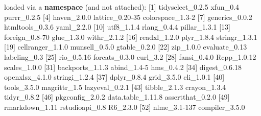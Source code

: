 \documentclass[]{article}
\newenvironment{Shaded}{\begin{snugshade}}{\end{snugshade}}
\newcommand{\KeywordTok}[1]{\textcolor[rgb]{0.13,0.29,0.53}{\textbf{{#1}}}}
\newcommand{\DecValTok}[1]{\textcolor[rgb]{0.00,0.00,0.81}{{#1}}}
\newcommand{\FloatTok}[1]{\textcolor[rgb]{0.00,0.00,0.81}{{#1}}}
\newcommand{\StringTok}[1]{\textcolor[rgb]{0.31,0.60,0.02}{{#1}}}
\newcommand{\NormalTok}[1]{{#1}}
\begin{document}
\begin{Shaded}
\begin{Highlighting}[]
\NormalTok{loaded via a }\KeywordTok{namespace} \NormalTok{(and not attached):}
\StringTok{ }\NormalTok{[}\DecValTok{1}\NormalTok{] tidyselect_0}\FloatTok{.2.5}  \NormalTok{xfun_0}\FloatTok{.4}          \NormalTok{purrr_0}\FloatTok{.2.5}      
 \NormalTok{[}\DecValTok{4}\NormalTok{] haven_2}\FloatTok{.0.0}       \NormalTok{lattice_0}\FloatTok{.20}\DecValTok{-35}   \NormalTok{colorspace_1}\FloatTok{.3}\DecValTok{-2} 
 \NormalTok{[}\DecValTok{7}\NormalTok{] generics_0}\FloatTok{.0.2}    \NormalTok{htmltools_0}\FloatTok{.3.6}   \NormalTok{yaml_2}\FloatTok{.2.0}       
\NormalTok{[}\DecValTok{10}\NormalTok{] utf8_1}\FloatTok{.1.4}        \NormalTok{rlang_0}\FloatTok{.4.4}       \NormalTok{pillar_1}\FloatTok{.3.1}     
\NormalTok{[}\DecValTok{13}\NormalTok{] foreign_0}\FloatTok{.8}\DecValTok{-70}    \NormalTok{glue_1}\FloatTok{.3.0}        \NormalTok{withr_2}\FloatTok{.1.2}      
\NormalTok{[}\DecValTok{16}\NormalTok{] readxl_1}\FloatTok{.2.0}      \NormalTok{plyr_1}\FloatTok{.8.4}        \NormalTok{stringr_1}\FloatTok{.3.1}    
\NormalTok{[}\DecValTok{19}\NormalTok{] cellranger_1}\FloatTok{.1.0}  \NormalTok{munsell_0}\FloatTok{.5.0}     \NormalTok{gtable_0}\FloatTok{.2.0}     
\NormalTok{[}\DecValTok{22}\NormalTok{] zip_1}\FloatTok{.0.0}         \NormalTok{evaluate_0}\FloatTok{.13}     \NormalTok{labeling_0}\FloatTok{.3}     
\NormalTok{[}\DecValTok{25}\NormalTok{] rio_0}\FloatTok{.5.16}        \NormalTok{forcats_0}\FloatTok{.3.0}     \NormalTok{curl_3}\FloatTok{.2}         
\NormalTok{[}\DecValTok{28}\NormalTok{] fansi_0}\FloatTok{.4.0}       \NormalTok{Rcpp_1}\FloatTok{.0.12}       \NormalTok{scales_1}\FloatTok{.0.0}     
\NormalTok{[}\DecValTok{31}\NormalTok{] backports_1}\FloatTok{.1.3}   \NormalTok{abind_1}\FloatTok{.4}\DecValTok{-5}       \NormalTok{hms_0}\FloatTok{.4.2}        
\NormalTok{[}\DecValTok{34}\NormalTok{] digest_0}\FloatTok{.6.18}     \NormalTok{openxlsx_4}\FloatTok{.1.0}    \NormalTok{stringi_1}\FloatTok{.2.4}    
\NormalTok{[}\DecValTok{37}\NormalTok{] dplyr_0}\FloatTok{.8.4}       \NormalTok{grid_3}\FloatTok{.5.0}        \NormalTok{cli_1}\FloatTok{.0.1}        
\NormalTok{[}\DecValTok{40}\NormalTok{] tools_3}\FloatTok{.5.0}       \NormalTok{magrittr_1}\FloatTok{.5}      \NormalTok{lazyeval_0}\FloatTok{.2.1}   
\NormalTok{[}\DecValTok{43}\NormalTok{] tibble_2}\FloatTok{.1.3}      \NormalTok{crayon_1}\FloatTok{.3.4}      \NormalTok{tidyr_0}\FloatTok{.8.2}      
\NormalTok{[}\DecValTok{46}\NormalTok{] pkgconfig_2}\FloatTok{.0.2}   \NormalTok{data.table_1}\FloatTok{.11.8} \NormalTok{assertthat_0}\FloatTok{.2.0} 
\NormalTok{[}\DecValTok{49}\NormalTok{] rmarkdown_1}\FloatTok{.11}    \NormalTok{rstudioapi_0}\FloatTok{.8}    \NormalTok{R6_2}\FloatTok{.3.0}         
\NormalTok{[}\DecValTok{52}\NormalTok{] nlme_3}\FloatTok{.1}\DecValTok{-137}      \NormalTok{compiler_3}\FloatTok{.5.0}   
\end{Highlighting}
\end{Shaded}
\end{document}
